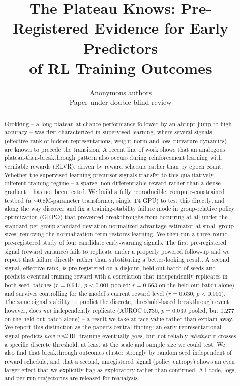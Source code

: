 \documentclass{article}
\title{The Plateau Knows: Pre-Registered Evidence for Early Predictors\\ of RL Training Outcomes}
\author{Anonymous authors \\ Paper under double-blind review}
\begin{document}
\maketitle

\begin{abstract}
Grokking -- a long plateau at chance performance followed by an abrupt jump to
high accuracy -- was first characterized in supervised learning, where several
signals (effective rank of hidden representations, weight-norm and loss-curvature
dynamics) are known to precede the transition. A recent line of work shows that
an analogous plateau-then-breakthrough pattern also occurs during reinforcement
learning with verifiable rewards (RLVR), driven by reward schedule rather than by
epoch count. Whether the supervised-learning precursor signals transfer to this
qualitatively different training regime -- a sparse, non-differentiable reward
rather than a dense gradient -- has not been tested. We build a fully
reproducible, compute-constrained testbed (a $\sim\!0.8$M-parameter transformer,
single T4 GPU) to test this directly, and along the way discover and fix a
training-stability failure mode in group-relative policy optimization (GRPO) that
prevented breakthroughs from occurring at all under the standard per-group
standard-deviation-normalized advantage estimator at small group sizes; removing
the normalization term restores learning. We then run a three-round,
pre-registered study of four candidate early-warning signals. The first
pre-registered signal (reward variance) fails to replicate under a properly
powered follow-up and we report that failure directly rather than substituting a
better-looking result. A second signal, effective rank, is pre-registered on a
disjoint, held-out batch of seeds and predicts eventual training reward with a
correlation that independently replicates in both seed batches ($r=0.647$,
$p<0.001$ pooled; $r=0.663$ on the held-out batch alone) and survives controlling
for the model's current reward level ($r=0.630$, $p<0.001$). The same signal's
ability to predict the discrete, threshold-based breakthrough event, however,
does \emph{not} independently replicate (AUROC $0.730$, $p=0.039$ pooled, but
$0.277$ on the held-out batch alone) -- a result we take at face value rather than
explain away. We report this distinction as the paper's central finding: an
early representational signal predicts \emph{how well} RL training eventually
goes, but not reliably \emph{whether} it crosses a specific discrete threshold, at
least at the scale and sample size we could test. We also find that breakthrough
outcomes cluster strongly by random seed independent of reward schedule, and that
a second, unregistered signal (policy entropy) shows an even larger effect that we
explicitly flag as exploratory rather than confirmed. All code, logs, and
per-run trajectories are released for reanalysis.
\end{abstract}
\end{document}
